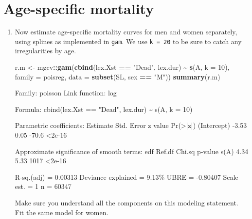 \documentclass[
]{book}
\newenvironment{Shaded}{\begin{snugshade}}{\end{snugshade}}
\newcommand{\AttributeTok}[1]{\textcolor[rgb]{0.13,0.29,0.53}{#1}}
\newcommand{\DecValTok}[1]{\textcolor[rgb]{0.00,0.00,0.81}{#1}}
\newcommand{\FunctionTok}[1]{\textcolor[rgb]{0.13,0.29,0.53}{\textbf{#1}}}
\newcommand{\NormalTok}[1]{#1}
\newcommand{\OtherTok}[1]{\textcolor[rgb]{0.56,0.35,0.01}{#1}}
\newcommand{\SpecialCharTok}[1]{\textcolor[rgb]{0.81,0.36,0.00}{\textbf{#1}}}
\newcommand{\StringTok}[1]{\textcolor[rgb]{0.31,0.60,0.02}{#1}}
\begin{document}
\section{Age-specific mortality}\label{age-specific-mortality}

\begin{enumerate}
\def\labelenumi{\arabic{enumi}.}
\item
  Now estimate age-specific mortality curves for men and
  women separately, using splines as implemented in \texttt{gam}.
  We use \texttt{k\ =\ 20} to be sure to catch any irregularities by age.

\begin{Shaded}
\begin{Highlighting}[]
\NormalTok{r.m }\OtherTok{\textless{}{-}}\NormalTok{ mgcv}\SpecialCharTok{::}\FunctionTok{gam}\NormalTok{(}\FunctionTok{cbind}\NormalTok{(lex.Xst }\SpecialCharTok{==} \StringTok{"Dead"}\NormalTok{, lex.dur) }\SpecialCharTok{\textasciitilde{}} \FunctionTok{s}\NormalTok{(A, }\AttributeTok{k =} \DecValTok{10}\NormalTok{),}
                 \AttributeTok{family =}\NormalTok{ poisreg,}
                   \AttributeTok{data =} \FunctionTok{subset}\NormalTok{(SL, sex }\SpecialCharTok{==} \StringTok{"M"}\NormalTok{))}
\FunctionTok{summary}\NormalTok{(r.m)}
\end{Highlighting}
\end{Shaded}

\begin{Shaded}
\begin{Highlighting}[]

\NormalTok{Family: poisson }
\NormalTok{Link function: log }

\NormalTok{Formula:}
\NormalTok{cbind(lex.Xst == "Dead", lex.dur) \textasciitilde{} s(A, k = 10)}

\NormalTok{Parametric coefficients:}
\NormalTok{            Estimate Std. Error z value Pr(\textgreater{}|z|)}
\NormalTok{(Intercept)    {-}3.53       0.05   {-}70.6   \textless{}2e{-}16}

\NormalTok{Approximate significance of smooth terms:}
\NormalTok{      edf Ref.df Chi.sq p{-}value}
\NormalTok{s(A) 4.34   5.33   1017  \textless{}2e{-}16}

\NormalTok{R{-}sq.(adj) =  0.00313   Deviance explained = 9.13\%}
\NormalTok{UBRE = {-}0.80407  Scale est. = 1         n = 60347}
\end{Highlighting}
\end{Shaded}

  Make sure you understand all the components on this modeling statement.
  Fit the same model for women.


\end{enumerate}
\end{document}

